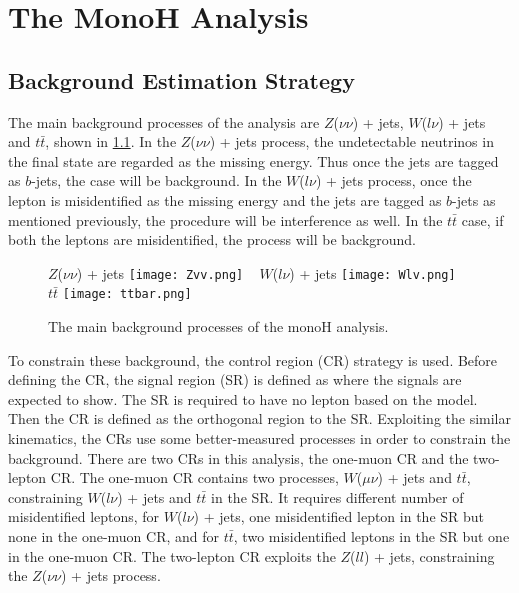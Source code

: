 \documentclass[class=NTHU_thesis, crop=false]{standalone}
\begin{document}
\chapter{The MonoH Analysis}
\section{Background Estimation Strategy}
The main background processes of the analysis are $Z$($\nu\nu$) + jets, $W$($l\nu$) + jets and $t\bar{t}$, shown in \cref{fig:Bkg-Processes}. In the $Z$($\nu\nu$) + jets process, the undetectable neutrinos in the final state are regarded as the missing energy. Thus once the jets are tagged as $b$-jets, the case will be background. In the $W$($l\nu$) + jets process, once the lepton is misidentified as the missing energy and the jets are tagged as $b$-jets as mentioned previously, the procedure will be interference as well. In the $t\bar{t}$ case, if both the leptons are misidentified, the process will be background.

\begin{figure}[!hbt]
	\captionsetup[subfigure]{labelformat=empty}
	\centering
	\subcaptionbox
	{$Z$($\nu\nu$) + jets
		\label{fig:Bkg-Processes-fig1}}
	{\texttt{[image: Zvv.png]}}
	~
	\subcaptionbox
	{$W$($l\nu$) + jets
		\label{fig:Bkg-Processes-fig2}}
	{\texttt{[image: Wlv.png]}}
	~
	\subcaptionbox
	{$t\bar{t}$
		\label{fig:Bkg-Processes-fig3}}
	{\texttt{[image: ttbar.png]}}
	\caption{The main background processes of the monoH analysis.}
	\label{fig:Bkg-Processes}
\end{figure}

To constrain these background, the control region (CR) strategy is used. Before defining the CR, the signal region (SR) is defined as where the signals are expected to show. The SR is required to have no lepton based on the model. Then the CR is defined as the orthogonal region to the SR. Exploiting the similar kinematics, the CRs use some better-measured processes in order to constrain the background. There are two CRs in this analysis, the one-muon CR and the two-lepton CR. The one-muon CR contains two processes, $W$($\mu\nu$) + jets and $t\bar{t}$, constraining $W$($l\nu$) + jets and $t\bar{t}$ in the SR. It requires different number of misidentified leptons, for $W$($l\nu$) + jets, one misidentified lepton in the SR but none in the one-muon CR, and for $t\bar{t}$, two misidentified leptons in the SR but one in the one-muon CR. The two-lepton CR exploits the $Z$($ll$) + jets, constraining the $Z$($\nu\nu$) + jets process.
\end{document}
